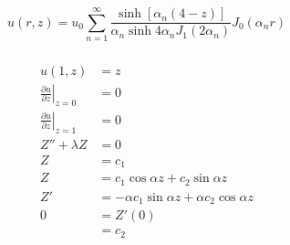 \documentclass{article}
\begin{document}
\setcounter{subsubsection}{2}
\subsubsection{}

\[u(r, z) = u_0 \sum_{n = 1}^\infty \frac{\sinh [\alpha_n (4 - z)]}{\alpha_n \sinh 4 \alpha_n J_1(2 \alpha_n)} J_0(\alpha_n r)\]

\setcounter{subsubsection}{4}
\subsubsection{}

\begin{align*}
  u(1, z)                                              & = z                                                                                                              \\
  \left. \frac{\partial u}{\partial z} \right|_{z = 0} & = 0                                                                                                              \\
  \left. \frac{\partial u}{\partial z} \right|_{z = 1} & = 0                                                                                                              \\
  Z'' + \lambda Z                                      & = 0                                                                                                              \\
  Z                                                    & = c_1                                                                                                            \\
  Z                                                    & = c_1 \cos \alpha z + c_2 \sin \alpha z                                                                          \\
  Z'                                                   & = -\alpha c_1 \sin \alpha z + \alpha c_2 \cos \alpha z                                                           \\
  0                                                    & = Z'(0)                                                                                                          \\
                                                       & = c_2                                                                                                            \\

\end{align*}
\end{document}

